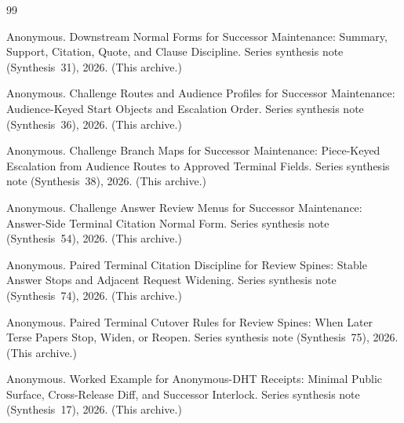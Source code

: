 \documentclass[11pt]{article}
\begin{document}
\begin{thebibliography}{99}\small

Anonymous.
\newblock Downstream Normal Forms for Successor Maintenance: Summary, Support, Citation, Quote, and Clause Discipline.
\newblock Series synthesis note (Synthesis~31), 2026. (This archive.)

Anonymous.
\newblock Challenge Routes and Audience Profiles for Successor Maintenance: Audience-Keyed Start Objects and Escalation Order.
\newblock Series synthesis note (Synthesis~36), 2026. (This archive.)

Anonymous.
\newblock Challenge Branch Maps for Successor Maintenance: Piece-Keyed Escalation from Audience Routes to Approved Terminal Fields.
\newblock Series synthesis note (Synthesis~38), 2026. (This archive.)

Anonymous.
\newblock Challenge Answer Review Menus for Successor Maintenance: Answer-Side Terminal Citation Normal Form.
\newblock Series synthesis note (Synthesis~54), 2026. (This archive.)

Anonymous.
\newblock Paired Terminal Citation Discipline for Review Spines: Stable Answer Stops and Adjacent Request Widening.
\newblock Series synthesis note (Synthesis~74), 2026. (This archive.)

Anonymous.
\newblock Paired Terminal Cutover Rules for Review Spines: When Later Terse Papers Stop, Widen, or Reopen.
\newblock Series synthesis note (Synthesis~75), 2026. (This archive.)

Anonymous.
\newblock Worked Example for Anonymous-DHT Receipts: Minimal Public Surface, Cross-Release Diff, and Successor Interlock.
\newblock Series synthesis note (Synthesis~17), 2026. (This archive.)

\end{thebibliography}
\end{document}
